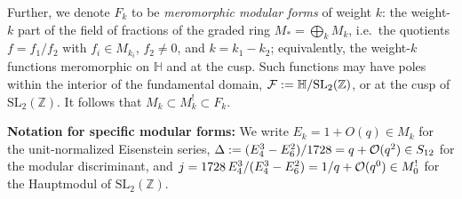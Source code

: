 \documentclass[11pt]{article}
\numberwithin{equation}{section}  %
\newcommand{\HH}{\mathbb{H}}
\newcommand{\ZZ}{\mathbb{Z}}
\newcommand{\SLZ}{\mathrm{SL}_2(\ZZ)}
\begin{document}
Further, we denote $F_k$ to be \emph{meromorphic modular forms} of weight $k$: 
the weight-$k$ part of the field of fractions of the graded ring $M_* = \bigoplus_k M_k$, i.e.\
the quotients $f = f_1/f_2$ with $f_i \in M_{k_i}$, $f_2 \ne 0$, and
$k = k_1 - k_2$; equivalently, the weight-$k$ functions meromorphic on
$\HH$ and at the cusp. Such functions may have poles within the interior of the fundamental 
domain, ${\cal F} := \HH/\SLZ$, or at the cusp of $\SLZ$. It follows that  
$M_k \subset M^!_k \subset F_k$.  

{\bf Notation for specific modular forms:} 
We write $E_k = 1 + O(q) \in M_k$ for the unit-normalized
Eisenstein series, $\Delta := (E_4^3 - E_6^2)/1728 = q + {\cal O}(q^2)
\in S_{12}$ for the modular discriminant,
and $j = 1728\,E_4^3/(E_4^3 - E_6^2) = 1/q + {\cal O}(q^0) \in M^!_0$
for the Hauptmodul of $\SLZ$.


 
 
\end{document}
